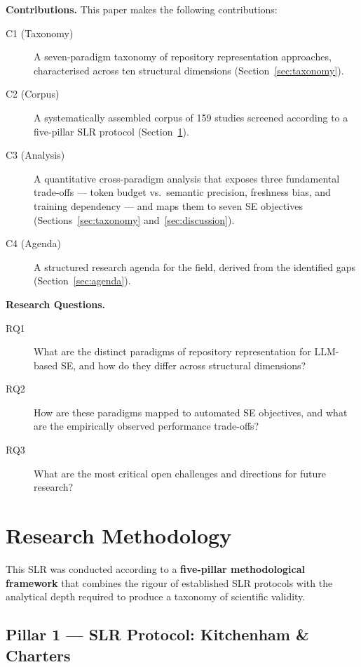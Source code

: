 \documentclass[acmsmall,screen,review]{acmart}
\begin{document}
\textbf{Contributions.} This paper makes the following contributions:
\begin{description}
  \item[C1 (Taxonomy)] A seven-paradigm taxonomy of repository
    representation approaches, characterised across ten structural
    dimensions (Section~\ref{sec:taxonomy}).
  \item[C2 (Corpus)] A systematically assembled corpus of 159 studies
    screened according to a five-pillar SLR protocol
    (Section~\ref{sec:methodology}).
  \item[C3 (Analysis)] A quantitative cross-paradigm analysis that
    exposes three fundamental trade-offs — token budget vs.\ semantic
    precision, freshness bias, and training dependency — and maps them
    to seven SE objectives (Sections~\ref{sec:taxonomy}
    and~\ref{sec:discussion}).
  \item[C4 (Agenda)] A structured research agenda for the field, derived
    from the identified gaps (Section~\ref{sec:agenda}).
\end{description}

\textbf{Research Questions.}
\begin{description}
  \item[RQ1] What are the distinct paradigms of repository representation
    for LLM-based SE, and how do they differ across structural
    dimensions?
  \item[RQ2] How are these paradigms mapped to automated SE objectives,
    and what are the empirically observed performance trade-offs?
  \item[RQ3] What are the most critical open challenges and directions
    for future research?
\end{description}

\section{Research Methodology}
\label{sec:methodology}

This SLR was conducted according to a \textbf{five-pillar
methodological framework} that combines the rigour of established SLR
protocols with the analytical depth required to produce a taxonomy of
scientific validity.

\subsection{Pillar 1 — SLR Protocol: Kitchenham \& Charters}
\end{document}
